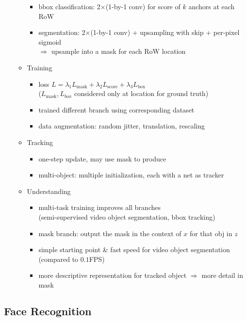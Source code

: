 \begin{itemize}
\begin{itemize}
\begin{itemize}
		\item bbox classification: 2$\times$(1-by-1 conv) for score of $k$ anchors at each RoW
		\item segmentation: 2$\times$(1-by-1 conv) + upsampling with skip + per-pixel sigmoid \\
		$\Rightarrow$ upsample into a mask for each RoW location
		\end{itemize}
	\item Training
		\begin{itemize}
		\item loss $L = \lambda_1 L_\text{mask} +\lambda_2 L_\text{score} +\lambda_3 L_\text{box}$ \\
		($L_\text{mask}, L_{box}$ considered only at location for ground truth)
		\item trained different branch using corresponding dataset
		\item data augmentation: random jitter, translation, rescaling
		\end{itemize}
	\item Tracking
		\begin{itemize}
		\item one-step update, may use mask to produce 
		\item multi-object: multiple initialization, each with a net as tracker
		\end{itemize}
	\item Understanding
		\begin{itemize}
		\item multi-task training improves all branches \\
		(semi-supervised video object segmentation, bbox tracking)
		\item mask branch: output the mask in the context of $x$ for that obj in $z$
		\item simple starting point \& fast speed for video object segmentation (compared to $0.1$FPS)
		\item more descriptive representation for tracked object $\Rightarrow$ more detail in mask
		\end{itemize}
	\end{itemize}
\end{itemize}

\subsection{Face Recognition}
